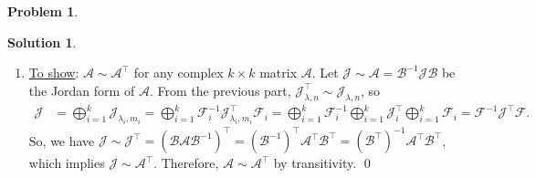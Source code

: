 \documentclass{book}
\theoremstyle{definition}
\newtheorem*{prob*}{Problem}
\newtheorem*{sln*}{Solution}
\newcommand{\F}{\mathcal{F}}
\newcommand{\A}{\mathcal{A}}
\newcommand{\B}{\mathcal{B}}
\newcommand{\jor}{\mathcal{J}}
\begin{document}
\begin{prob*}
\begin{sln*}
\begin{enumerate}
		 
		\item \underline{To show}: $\A \sim \A^\top$ for any complex $k\times k$ matrix $\A$. Let $\jor \sim \A = \B^{-1} \jor \B $ be the Jordan form of $\A$. From the previous part, $\jor^\top_{\lambda,n} \sim \jor_{\lambda,n}$, so
		\begin{align*}
		\jor &= \bigoplus^{k}_{i=1}\jor_{\lambda_i,m_i} = \bigoplus^k_{i=1} \F_i^{-1} \jor^\top_{\lambda_i,m_i} \F_i 
		= \bigoplus^k_{i=1} \F_i^{-1}\bigoplus^k_{i=1} \jor^\top_{i} \bigoplus^k_{i=1} \F_i 
		= \F^{-1}\jor^\top \F.
		\end{align*}
		So, we have $\jor \sim \jor^\top = (\B\A\B^{-1})^\top = (\B^{-1})^\top \A^\top \B^\top = (\B^\top)^{-1} \A^\top \B^\top$, which implies $\jor \sim \A^\top$. Therefore, $\A \sim \A^\top$ by transitivity.  \qed
		
		
		 

		\end{enumerate}
	\end{sln*}
	
	
\end{prob*}




\newpage
\end{document}
